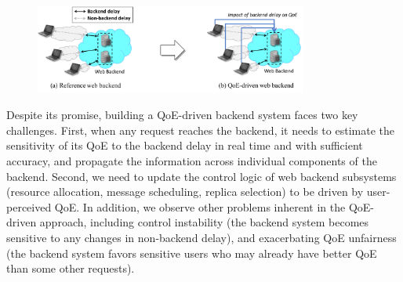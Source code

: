 \begin{figure}[t]
	\centering
	\vspace{-0.5cm}
	\includegraphics[width=0.8\textwidth]{figs/intro-overview-new.pdf}
	\vspace{-0.1cm}
	\label{fig:intro-overview}
\end{figure}





Despite its promise, building a QoE-driven backend system faces two key challenges.
First, when any request reaches the backend, it needs to estimate the sensitivity of its QoE to the backend delay in real time and with sufficient accuracy, and propagate the information across individual components of the backend.
Second, we need to update the control logic of web backend subsystems (\eg resource allocation, message scheduling, replica selection) to be driven by user-perceived QoE.
In addition, we observe other problems inherent in the QoE-driven approach, including control instability (\ie the backend system becomes sensitive to any changes in non-backend delay), and exacerbating QoE unfairness (\ie the backend system favors sensitive users who may already have better QoE than some other requests).

